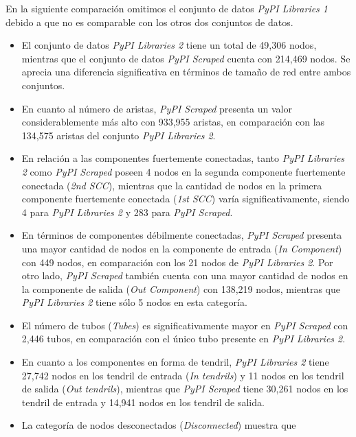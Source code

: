 En la siguiente comparación omitimos el conjunto de datos \textit{PyPI Libraries 1} debido a que no es comparable con los otros dos conjuntos de datos.

\begin{itemize}
    \item El conjunto de datos \textit{PyPI Libraries 2} tiene un total de 49,306 nodos,
          mientras que el conjunto de datos \textit{PyPI Scraped} cuenta con 214,469 nodos.
          Se aprecia una diferencia significativa en términos de tamaño de red entre ambos conjuntos.
    \item En cuanto al número de aristas, \textit{PyPI Scraped} presenta un valor
          considerablemente más alto con 933,955 aristas, en comparación con las 134,575
          aristas del conjunto \textit{PyPI Libraries 2}.
    \item En relación a las componentes fuertemente conectadas, tanto \textit{PyPI Libraries 2}
          como \textit{PyPI Scraped} poseen 4 nodos en la segunda componente fuertemente
          conectada (\textit{2nd SCC}), mientras que la cantidad de nodos en la primera
          componente fuertemente conectada (\textit{1st SCC}) varía significativamente,
          siendo 4 para \textit{PyPI Libraries 2} y 283 para \textit{PyPI Scraped}.
    \item En términos de componentes débilmente conectadas, \textit{PyPI Scraped}
          presenta una mayor cantidad de nodos en la componente de entrada (\textit{In Component})
          con 449 nodos, en comparación con los 21 nodos de \textit{PyPI Libraries 2}. Por otro
          lado, \textit{PyPI Scraped} también cuenta con una mayor cantidad de nodos en la
          componente de salida (\textit{Out Component}) con 138,219 nodos, mientras que
          \textit{PyPI Libraries 2} tiene sólo 5 nodos en esta categoría.
    \item El número de tubos (\textit{Tubes}) es significativamente mayor en
          \textit{PyPI Scraped} con 2,446 tubos, en comparación con el único tubo presente
          en \textit{PyPI Libraries 2}.
    \item En cuanto a los componentes en forma de tendril, \textit{PyPI Libraries 2} tiene
          27,742 nodos en los tendril de entrada (\textit{In tendrils}) y 11 nodos en los
          tendril de salida (\textit{Out tendrils}), mientras que \textit{PyPI Scraped} tiene
          30,261 nodos en los tendril de entrada y 14,941 nodos en los tendril de salida.
    \item La categoría de nodos desconectados (\textit{Disconnected}) muestra que

\end{itemize}
